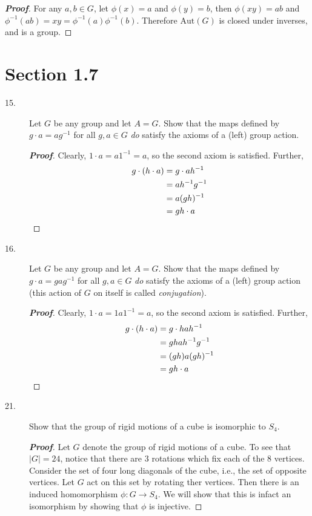 \documentclass[12pt,leqno]{book}
\theoremstyle{definition}
\newenvironment{Proof}{\begin{proof}[\textnormal{\textbf{Proof}}]}{\end{proof}}
\begin{document}
\begin{description}
\begin{description}
\begin{Proof}
For any $a,b\in G$, let $\phi(x)=a$ and $\phi(y)=b$, then $\phi(xy)=ab$ and $\phi^{-1}(ab)=xy=\phi^{-1}(a)\phi^{-1}(b)$. Therefore $\text{Aut}(G)$ is closed under inverses, and is a group.
  \end{Proof}

  \end{description}
\section*{Section 1.7}
\begin{description}
 \item [15.] Let $G$ be any group and let $A=G$. Show that the maps defined by $g\cdot a=ag^{-1}$ for all $g,a\in G$ \textit{do} satisfy the axioms of a (left) group action.
  \begin{Proof}
   Clearly, $1\cdot a=a1^{-1}=a$, so the second axiom is satisfied. Further, \begin{align*}g\cdot(h\cdot a)&=g\cdot ah^{-1}\\&=ah^{-1}g^{-1}\\&=a(gh)^{-1}\\&=gh\cdot a\qedhere\end{align*}
  \end{Proof}

 \item [16.] Let $G$ be any group and let $A=G$. Show that the maps defined by $g\cdot a=gag^{-1}$ for all $g,a\in G$ \textit{do} satisfy the axioms of a (left) group action (this action of $G$ on itself is called \textit{conjugation}).
 \begin{Proof}
   Clearly, $1\cdot a=1a1^{-1}=a$, so the second axiom is satisfied. Further, \begin{align*}g\cdot(h\cdot a)&=g\cdot hah^{-1}\\&=ghah^{-1}g^{-1}\\&=(gh)a(gh)^{-1}\\&=gh\cdot a\qedhere\end{align*}
  \end{Proof}
 \item [21.] Show that the group of rigid motions of a cube is isomorphic to $S_4$. 
  \begin{Proof}
Let $G$ denote the group of rigid motions of a cube. To see that $|G|=24$, notice that there are 3 rotations which fix each of the 8 vertices. Consider the set of four long diagonals of the cube, i.e., the set of opposite vertices. Let $G$ act on this set by rotating ther vertices. Then there is an induced homomorphism $\phi:G\to S_4$. We will show that this is infact an isomorphism by showing that $\phi$ is injective.


\end{Proof}
\end{description}
\end{description}
\end{document}
